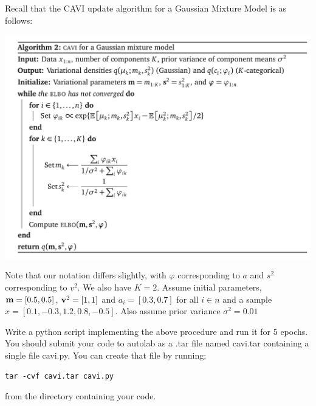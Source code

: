 \documentclass[11pt,addpoints,answers]{exam}
\numberwithin{equation}{section} %
\numberwithin{figure}{section} %
\numberwithin{table}{section} %
\begin{document}
Recall that the CAVI update algorithm for a Gaussian Mixture Model is as follows:
\begin{center}
    \includegraphics[width=0.70\columnwidth]{figures/cavi.png}

\end{center}
Note that our notation differs slightly, with $\varphi$ corresponding to $a$ and $s^2$ corresponding to $v^2$. We also have $K=2$.
Assume initial parameters, 
$\mathbf{m} = [0.5,0.5]$, $
\mathbf{v}^2 = [1,1]$ and $a_i= [0.3,0.7]$ for all $i \in n$ and a sample $x = [0.1,-0.3,1.2,0.8,-0.5]$. Also assume prior variance $\sigma^2 = 0.01$

Write a python script implementing the above procedure and run it for 5 epochs. You should submit your code to autolab as a .tar file named cavi.tar containing a single file cavi.py.
You can create that file by running:
\begin{lstlisting}
tar -cvf cavi.tar cavi.py
\end{lstlisting}
from the directory containing your code.
\end{document}
